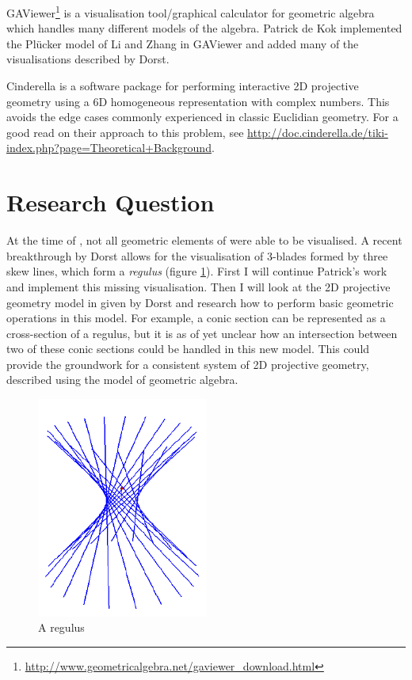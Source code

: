 \documentclass[a4paper, 10pt]{article}
\begin{document}
GAViewer\footnote{\url{http://www.geometricalgebra.net/gaviewer\_download.html}}
is a visualisation tool/graphical calculator for geometric algebra which handles
many different models of the algebra. Patrick de Kok\cite{dekok2012} implemented
the Pl\"{u}cker model of Li and Zhang in GAViewer and added many of the
visualisations described by Dorst.

Cinderella\cite{richter1999interactive} is a software package for performing
interactive 2D projective geometry using a 6D homogeneous representation with
complex numbers. This avoids the edge cases commonly experienced in classic
Euclidian geometry.  For a good read on their approach to this problem, see
\url{http://doc.cinderella.de/tiki-index.php?page=Theoretical+Background}.

\section{Research Question}
At the time of \cite{dekok2012}, not all geometric elements of \rp were able to
be visualised. A recent breakthrough by Dorst allows for the visualisation of
3-blades formed by three skew lines, which form a \emph{regulus} (figure
\ref{fig:regulus}). First I will continue Patrick's work and implement this
missing visualisation. Then I will look at the 2D projective geometry model in
\rp given by Dorst and research how to perform basic geometric operations in
this model. For example, a conic section can be represented as a cross-section
of a regulus, but it is as of yet unclear how an intersection between two of
these conic sections could be handled in this new model. This could provide the
groundwork for a consistent system of 2D projective geometry, described using
the \rp model of geometric algebra.

\begin{figure}[htbp]
  \centering
  \includegraphics[width=0.5\textwidth]{regulus.png}
  \caption{A regulus}
  \label{fig:regulus}
\end{figure}
\end{document}
